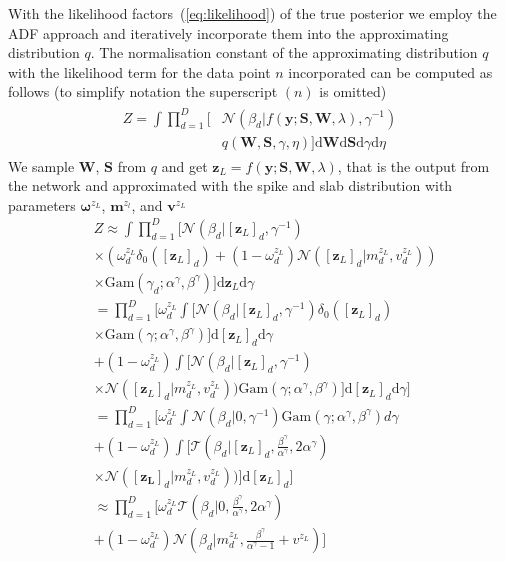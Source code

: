 \documentclass[letterpaper]{article}
\begin{document}
With the likelihood factors~(\ref{eq:likelihood}) of the true posterior we employ the ADF approach and iteratively incorporate them into the approximating distribution $q$. The normalisation constant of the approximating distribution $q$ with the likelihood term for the data point $n$ incorporated can be computed as follows (to simplify notation the superscript $(n)$ is omitted)
\begin{align}
\label{eq:Z}
\begin{split}
Z = \int \prod_{d=1}^{D} \big[&\mathcal{N}(\beta_d | f(\mathbf{y} ; \mathbf{S}, \mathbf{W}, \lambda), \gamma^{-1}) \\
 &q(\mathbf{W}, \mathbf{S}, \gamma, \eta)\big] \mathrm{d}\mathbf{W} \mathrm{d}\mathbf{S} \mathrm{d}\gamma \mathrm{d}\eta
 \end{split}
\end{align}
We sample $\mathbf{W}$, $\mathbf{S}$ from $q$ and get $\mathbf{z}_L = f(\mathbf{y} ; \mathbf{S}, \mathbf{W}, \lambda)$, that is the output from the network and approximated with the spike and slab distribution with parameters $\boldsymbol\omega^{z_L}$, $\mathbf{m}^{z_l}$, and $\mathbf{v}^{z_L}$
\begin{align}
&Z \approx \int \prod_{d=1}^{D} \big[\mathcal{N}(\beta_d | [\mathbf{z}_L]_d, \gamma^{-1}) \nonumber \\
&\times (\omega^{z_L}_d \delta_0([\mathbf{z}_L]_d) + (1 - \omega^{z_L}_d)\mathcal{N}([\mathbf{z}_L]_d | m^{z_L}_d, v^{z_L}_d)) \nonumber\\
&\times \text{Gam} (\gamma_d; \alpha^\gamma, \beta^\gamma)\big]\mathrm{d}\mathbf{z}_L \mathrm{d}\gamma  \nonumber\\
&= \prod_{d=1}^{D} \Big[\omega^{z_L}_d \int \big[\mathcal{N}(\beta_d | [\mathbf{z}_L]_d, \gamma^{-1})  \delta_0([\mathbf{z}_L]_d) \nonumber \\
&\times \text{Gam} (\gamma; \alpha^\gamma, \beta^\gamma)\big]\mathrm{d}[\mathbf{z}_L]_d \mathrm{d}\gamma  \nonumber\\
& + (1 - \omega^{z_L}_d)\int \big[\mathcal{N}(\beta_d | [\mathbf{z}_L]_d, \gamma^{-1})\nonumber\\
&\times \mathcal{N}([\mathbf{z}_L]_d | m^{z_L}_d, v^{z_L}_d)) \text{Gam} (\gamma; \alpha^\gamma, \beta^\gamma)\big]\mathrm{d}[\mathbf{z}_L]_d \mathrm{d}\gamma\Big]  \nonumber\\
& = \prod_{d=1}^{D} \Big[\omega^{z_L}_d \int \mathcal{N}(\beta_d | 0, \gamma^{-1})  \text{Gam} (\gamma; \alpha^\gamma, \beta^\gamma) d\gamma  \nonumber\\
& + (1 - \omega^{z_L}_d)\int \big[\mathcal{T}(\beta_d | [\mathbf{z}_L]_d, \frac{\beta^\gamma}{\alpha^\gamma}, 2\alpha^\gamma)  \nonumber\\
&\times \mathcal{N}([\mathbf{z_L}]_d| m^{z_L}_d, v^{z_L}_d))\big] \mathrm{d}[\mathbf{z}_L]_d\Big]  \nonumber\\
& \approx \prod_{d=1}^D \Big[\omega^{z_L}_d  \mathcal{T}(\beta_d | 0, \frac{\beta^\gamma}{\alpha^\gamma}, 2\alpha^\gamma) \nonumber \\ 
\label{eq:Z_approx}
&+ (1 - \omega^{z_L}_d)\mathcal{N}(\beta_d | m^{z_L}_d, \frac{\beta^\gamma}{\alpha^\gamma - 1} + v^{z_L})\Big]
\end{align}
\end{document}
